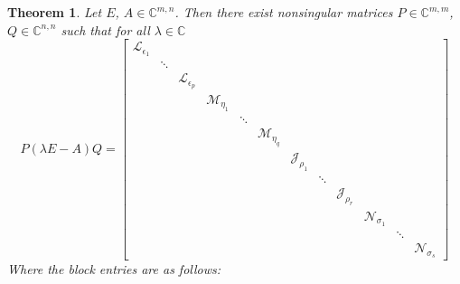 \documentclass[]{book}
\newtheorem{theorem}{Theorem}[chapter]
\theoremstyle{definition}
\theoremstyle{definition}
\theoremstyle{definition}
\theoremstyle{definition}
\theoremstyle{remark}
\begin{document}
\begin{theorem}
\protect\hypertarget{thm:kcf}{}{\label{thm:kcf} }
Let \(E\), \(A \in \mathbb C^{m,n}\). Then there exist nonsingular matrices \(P\in \mathbb C^{m,m}\), \(Q\in \mathbb C^{n,n}\) such that for all \(\lambda \in \mathbb C\)
\begin{equation*}
P(\lambda E -A)Q = 
\begin{bmatrix}
\mathcal L_{\epsilon_1} \\
& \ddots \\
&& \mathcal L_{\epsilon_p} \\
&&& \mathcal M_{\eta_1} \\
&&&& \ddots \\
&&&&& \mathcal M_{\eta_q} \\
&&&&&& \mathcal J_{\rho_1} \\
&&&&&&& \ddots \\
&&&&&&&& \mathcal J_{\rho_r} \\
&&&&&&&&& \mathcal N_{\sigma_1} \\
&&&&&&&&&& \ddots \\
&&&&&&&&&&& \mathcal N_{\sigma_s}
\end{bmatrix}
\end{equation*}
Where the block entries are as follows:


\end{theorem}
\end{document}
